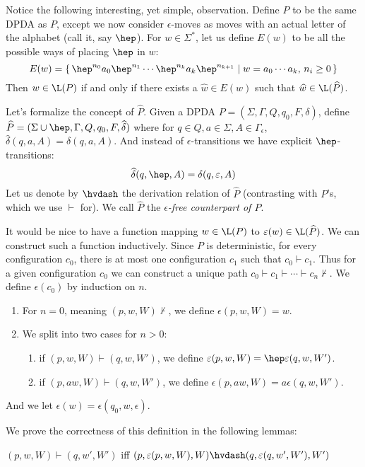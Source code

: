 \documentclass{llncs}
\begin{document}
Notice the following interesting, yet simple, observation.
Define $\widehat P$ to be the same DPDA as $P$, except we now consider $\epsilon$-moves as moves with an actual letter of the alphabet (call it, say $\hep$).
For $w\in\Sigma^*$, let us define $E(w)$ to be all the possible ways of placing $\hep$ in $w$:
$$ E(w) = \set{\hep^{n_0}a_0\hep^{n_1}\cdots\hep^{n_k}a_k\hep^{n_{k+1}}}[w=a_0\cdots a_k,\,n_i\geq0] $$
Then $w\in\L(P)$ if and only if there exists a $\widehat w\in E(w)$ such that $\widehat w\in\L(\widehat P)$.

Let's formalize the concept of $\widehat P$.
Given a DPDA $P=(\Sigma,\Gamma,Q,q_0,F,\delta)$, define $\widehat P=(\Sigma\cup\hep,\Gamma,Q,q_0,F,\widehat\delta)$ where for $q\in Q,a\in\Sigma,A\in\Gamma_\epsilon$, $\widehat\delta(q,a,A)=\delta(q,a,A)$.
And instead of $\epsilon$-transitions we have explicit $\hep$-transitions:
$$ \widehat\delta(q,\hep,A) = \delta(q,\epsilon,A) $$
Let us denote by $\hvdash$ the derivation relation of $\widehat P$ (contrasting with $P$'s, which we use $\vdash$ for).
We call $\widehat P$ the \emph{$\epsilon$-free counterpart of $P$}.

It would be nice to have a function mapping $w\in\L(P)$ to $\epsilon(w)\in\L(\widehat P)$.
We can construct such a function inductively.
Since $P$ is deterministic, for every configuration $c_0$, there is at most one configuration $c_1$ such that $c_0\vdash c_1$.
Thus for a given configuration $c_0$ we can construct a unique path $c_0\vdash c_1\vdash\cdots\vdash c_n\nvdash$.
We define $\epsilon(c_0)$ by induction on $n$.
\begin{enumerate}
    \item For $n=0$, meaning $(p,w,W)\nvdash$, we define $\epsilon(p,w,W)=w$.
    \item We split into two cases for $n>0$:
        \begin{enumerate}
            \item if $(p,w,W)\vdash(q,w,W')$, we define $\epsilon(p,w,W)=\hep\epsilon(q,w,W')$.
            \item if $(p,aw,W)\vdash(q,w,W')$, we define $\epsilon(p,aw,W)=a\epsilon(q,w,W')$.
        \end{enumerate}
\end{enumerate}
And we let $\epsilon(w)=\epsilon(q_0,w,\epsilon)$.

We prove the correctness of this definition in the following lemmas:

\begin{lemma}

    $(p,w,W)\vdash(q,w',W')$ iff $(p,\epsilon(p,w,W),W)\hvdash(q,\epsilon(q,w',W'),W')$

\end{lemma}
\end{document}
